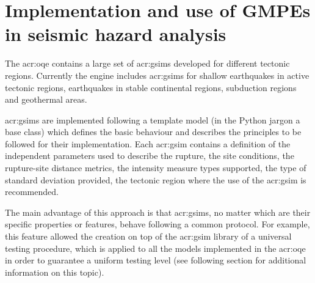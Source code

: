 %
\section{Implementation and use of GMPEs in seismic hazard analysis}
The \gls{acr:oqe} contains a large set of \glspl{acr:gsim}
developed for different tectonic regions. 
%
Currently the engine includes \glspl{acr:gsim} for shallow earthquakes
in active tectonic regions, earthquakes in stable continental regions,
subduction regions and geothermal areas.

\glspl{acr:gsim} are implemented following a template model (in the 
Python jargon a base class) which defines the basic behaviour and 
describes the principles to be followed for their implementation.
%
Each \gls{acr:gsim} contains a definition of the independent parameters
used to describe the rupture, the site conditions, the rupture-site
distance metrics, the intensity measure types supported, the type of 
standard deviation provided, the tectonic region where the use of the 
\gls{acr:gsim} is recommended.

The main advantage of this approach is that \glspl{acr:gsim}, no matter 
which are their specific properties or features, behave following 
a common protocol. 
%
For example, this feature allowed the creation on top of the 
\gls{acr:gsim} library of a universal testing procedure, which is
applied to all the models implemented in the \gls{acr:oqe} in order to  
guarantee a uniform testing level (see following section for
additional information on this topic). 

